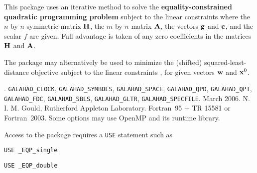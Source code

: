 \documentclass{galahad}
\newcommand{\packagename}{EQP}
\newcommand{\fullpackagename}{\libraryname\_\packagename}
\begin{document}
\galheader


\galsummary
This package uses an iterative method
to solve the {\bf equality-constrained quadratic programming problem}
subject to the linear constraints
where the $n$ by $n$ symmetric matrix ${\mathbf{H}}$, the $m$ by $n$ matrix ${\mathbf{A}}$, 
the  vectors ${\mathbf{g}}$ and ${\mathbf{c}}$, and the scalar $f$ are given.
Full advantage is taken of any zero coefficients in the matrices ${\mathbf{H}}$ 
and ${\mathbf{A}}$.

The package may alternatively be used to minimize the (shifted) 
squared-least-distance objective
subject to the linear constraints , 
for given vectors ${\mathbf{w}}$ and ${\mathbf{x}}^{0}$.


\galattributes
\galversions{\tt  \fullpackagename\_single, \fullpackagename\_double}.
\galuses 
{\tt GALAHAD\_\-CLOCK},
{\tt GALAHAD\_SY\-M\-BOLS}, 
{\tt GALAHAD\-\_\-SPACE}, 
{\tt GALAHAD\_QPD},
{\tt GALAHAD\_QPT},
{\tt GALAHAD\_FDC},
{\tt GALAHAD\_SBLS}, 
{\tt GALAHAD\_GLTR}, 
{\tt GALAHAD\_SPECFILE}.
\galdate March 2006.
\galorigin N. I. M. Gould, Rutherford Appleton Laboratory.
\gallanguage Fortran~95 + TR 15581 or Fortran~2003. 
\galparallelism Some options may use OpenMP and its runtime library.


\galhowto


Access to the package requires a {\tt USE} statement such as

\medskip{}

\hspace{8mm} {\tt USE \fullpackagename\_single}

\medskip{}

\hspace{8mm} {\tt USE  \fullpackagename\_double}

\medskip
\end{document}
